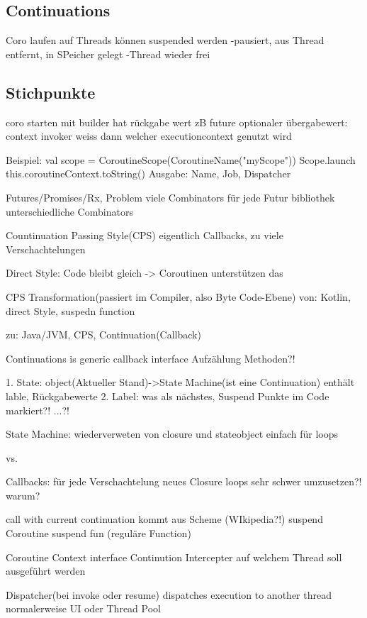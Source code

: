 \documentclass[fontsize=12pt,paper=a4,twoside=semi,parskip=half-,headsepline,headinclude]{scrreprt}
\begin{document}
\subsection{Continuations}

Coro laufen auf Threads
können suspended werden
-pausiert, aus Thread entfernt, in SPeicher gelegt
-Thread wieder frei

\newpage

\subsection{Stichpunkte}

coro starten mit builder
hat rückgabe wert zB future
optionaler übergabewert: context
invoker weiss dann welcher executioncontext genutzt wird

Beispiel:
val scope = CoroutineScope(CoroutineName("myScope"))
Scope.launch{
	this.coroutineContext.toString()
}
Ausgabe: Name, Job, Dispatcher

Futures/Promises/Rx, Problem viele Combinators
für jede Futur bibliothek unterschiedliche Combinators

Countinuation Passing Style(CPS)
eigentlich Callbacks, zu viele Verschachtelungen

Direct Style: Code bleibt gleich -> Coroutinen unterstützen das

CPS Transformation(passiert im Compiler, also Byte Code-Ebene)
von:
Kotlin, direct Style, suspedn function

zu:
Java/JVM, CPS, Continuation(Callback)

Continuations is generic callback interface
Aufzählung Methoden?!

1. State: object(Aktueller Stand)->State Machine(ist eine Continuation)
	enthält lable, Rückgabewerte
2. Label: was als nächstes, Suspend Punkte im Code markiert?!
...?!

State Machine:
wiederverweten von closure und stateobject
einfach für loops

vs.

Callbacks:
für jede Verschachtelung neues Closure
loops sehr schwer umzusetzen?! warum?

call with current continuation kommt aus Scheme (WIkipedia?!)
suspend Coroutine
suspend fun (reguläre Function)

Coroutine Context
interface Continution Intercepter
auf welchem Thread soll ausgeführt werden

Dispatcher(bei invoke oder resume)
dispatches execution to another thread
normalerweise UI oder Thread Pool
\end{document}
